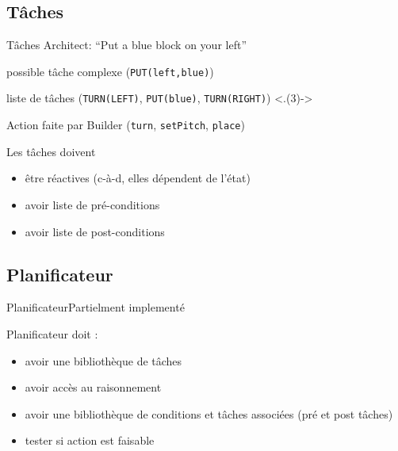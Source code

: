 \documentclass[aspectratio=169]{audition-beamer}
\begin{document}
\subsection{Tâches}
\begin{frame}{Tâches}
  \vfill
  \pause
  Architect: ``Put a blue block on your left''

  \vfill
  \begin{description}[<+(1)->]
    \item[Filtered Task] possible tâche complexe (\texttt{PUT(left,blue)})
    \item[Task] liste de tâches (\texttt{TURN(LEFT)}, \texttt{PUT(blue)}, \texttt{TURN(RIGHT)}) \only<.(3)->{\alert{\textleftarrow} }
    \item[Commands] Action faite par Builder (\texttt{turn}, \texttt{setPitch}, \texttt{place})
  \end{description}

  \vfill
  \pause
  Les tâches doivent
  \begin{itemize}[<+(1)->]
    \item être réactives (c-à-d, elles dépendent de l'état)
    \item avoir liste de pré-conditions
    \item avoir liste de post-conditions
  \end{itemize}

\end{frame}

\subsection{Planificateur}
\begin{frame}{Planificateur}{Partielment implementé }

  \pause
  Planificateur doit :
  \begin{itemize}[<+(1)->]
    \item[\only<7->{\checkmark}] avoir une bibliothèque de tâches
    \item[\only<7->{\checkmark}] avoir accès au raisonnement
    \item[] avoir une bibliothèque de conditions et tâches associées (pré et post tâches)
    \item[] tester si action est faisable
  \end{itemize}
\end{frame}
\end{document}
